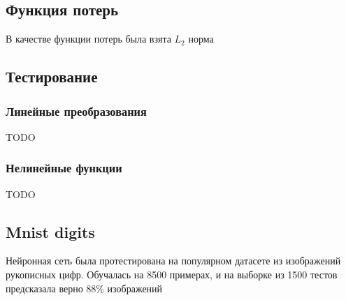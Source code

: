 \documentclass{article}
\begin{document}
\subsection{Функция потерь}
В качестве функции потерь была взята $L_2$ норма

\subsection{Тестирование}

\subsubsection{Линейные преобразования}

TODO

\subsubsection{Нелинейные функции}

TODO

\subsection{Mnist digits}

Нейронная сеть была протестирована на популярном датасете из изображений рукописных цифр. Обучалась на 8500 примерах, и на выборке из 1500 тестов предсказала верно 88\% изображений











\end{document}
